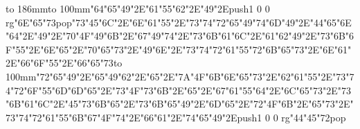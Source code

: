 \hbox to 186mm{\hsize=81mm\vbox to 100mm{\vfill\ipa\char"64\ipa\char"65\ipa\char"49\ipa\char"2E\ipa\char"61\ipa\char"55\ipa\char"62\ipa\char"2E\ipa\char"49\ipa\char"2E\pdfcolorstack\match push{1 0 0 rg}\ipa\char"6E\ipa\char"65\ipa\char"73\pdfcolorstack\match pop{}\medskip\ipa\char"73\ipa\char"45\ipa\char"6C\ipa\char"2E\ipa\char"6E\ipa\char"61\ipa\char"55\ipa\char"2E\ipa\char"73\ipa\char"74\ipa\char"72\ipa\char"65\ipa\char"49\ipa\char"74\medskip\ipa\char"6D\ipa\char"49\ipa\char"2E\ipa\char"44\ipa\char"65\ipa\char"6E\ipa\char"64\ipa\char"2E\ipa\char"49\ipa\char"2E\ipa\char"70\ipa\char"4F\ipa\char"49\ipa\char"6B\ipa\char"2E\ipa\char"67\ipa\char"49\ipa\char"74\ipa\char"2E\ipa\char"73\ipa\char"6B\ipa\char"61\ipa\char"6C\ipa\char"2E\ipa\char"61\ipa\char"62\medskip\ipa\char"49\ipa\char"2E\ipa\char"73\ipa\char"6B\ipa\char"6F\ipa\char"55\ipa\char"2E\ipa\char"6E\ipa\char"65\ipa\char"2E\ipa\char"70\ipa\char"65\ipa\char"73\ipa\char"2E\ipa\char"49\ipa\char"6E\ipa\char"2E\ipa\char"73\ipa\char"74\ipa\char"72\ipa\char"61\ipa\char"55\ipa\char"72\medskip\ipa\char"6B\ipa\char"65\ipa\char"73\ipa\char"2E\ipa\char"6E\ipa\char"61\ipa\char"2E\ipa\char"66\ipa\char"6F\ipa\char"55\ipa\char"2E\ipa\char"66\ipa\char"65\ipa\char"73\vfill}\hfill\vbox to 100mm{\vfill\ipa\char"72\ipa\char"65\ipa\char"49\ipa\char"2E\ipa\char"65\ipa\char"49\ipa\char"62\ipa\char"2E\ipa\char"65\ipa\char"2E\ipa\char"7A\ipa\char"4F\ipa\char"6B\medskip\ipa\char"6E\ipa\char"65\ipa\char"73\ipa\char"2E\ipa\char"62\ipa\char"61\ipa\char"55\ipa\char"2E\ipa\char"73\ipa\char"74\ipa\char"72\ipa\char"6F\ipa\char"55\ipa\char"6D\medskip\ipa\char"6D\ipa\char"65\ipa\char"2E\ipa\char"73\ipa\char"4F\ipa\char"73\ipa\char"6B\ipa\char"2E\ipa\char"65\ipa\char"2E\ipa\char"67\ipa\char"61\ipa\char"55\ipa\char"64\ipa\char"2E\ipa\char"6C\ipa\char"65\ipa\char"73\ipa\char"2E\ipa\char"73\ipa\char"6B\ipa\char"61\ipa\char"6C\ipa\char"2E\ipa\char"45\ipa\char"73\ipa\char"6B\medskip\ipa\char"65\ipa\char"2E\ipa\char"73\ipa\char"6B\ipa\char"65\ipa\char"49\ipa\char"2E\ipa\char"6D\ipa\char"65\ipa\char"2E\ipa\char"72\ipa\char"4F\ipa\char"6B\ipa\char"2E\ipa\char"65\ipa\char"73\ipa\char"2E\ipa\char"73\ipa\char"74\ipa\char"72\ipa\char"61\ipa\char"55\ipa\char"6B\medskip\ipa\char"67\ipa\char"4F\ipa\char"74\ipa\char"2E\ipa\char"66\ipa\char"61\ipa\char"2E\ipa\char"74\ipa\char"65\ipa\char"49\ipa\char"2E\pdfcolorstack\match push{1 0 0 rg}\ipa\char"44\ipa\char"45\ipa\char"72\pdfcolorstack\match pop{}\vfill}}\eject
